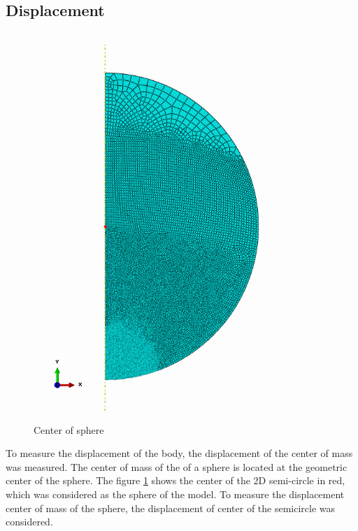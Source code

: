 \subsection{Displacement}

\begin{figure}
  \begin{center}
	\includegraphics[scale=0.5]{../images/Mesh/Center.png}
  \end{center}
  \caption{Center of sphere}
  \label{fig:center}
\end{figure}

To measure the displacement of the body, the displacement of the center of mass was measured. The center of mass of the of a sphere is located at the geometric center of the sphere. The figure \ref{fig:center} shows the center of the 2D semi-circle in red, which was considered as the sphere of the model. To measure the displacement center of mass of the sphere, the displacement of center of the semicircle was considered.

